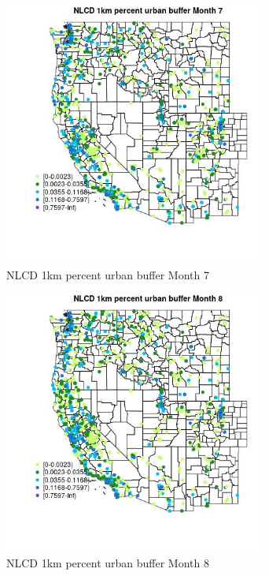 \begin{figure} 
\centering  
\includegraphics[width=0.77\textwidth]{Code_Outputs/Report_ML_input_PM25_Step4_part_f_de_duplicated_aves_prioritize_24hr_obswNAs_MapObsMo7NLCD_1km_percent_urban_buffer.jpg} 
\caption{\label{fig:Report_ML_input_PM25_Step4_part_f_de_duplicated_aves_prioritize_24hr_obswNAsMapObsMo7NLCD_1km_percent_urban_buffer}NLCD 1km percent urban buffer Month 7} 
\end{figure} 
 

\begin{figure} 
\centering  
\includegraphics[width=0.77\textwidth]{Code_Outputs/Report_ML_input_PM25_Step4_part_f_de_duplicated_aves_prioritize_24hr_obswNAs_MapObsMo8NLCD_1km_percent_urban_buffer.jpg} 
\caption{\label{fig:Report_ML_input_PM25_Step4_part_f_de_duplicated_aves_prioritize_24hr_obswNAsMapObsMo8NLCD_1km_percent_urban_buffer}NLCD 1km percent urban buffer Month 8} 
\end{figure} 
 


